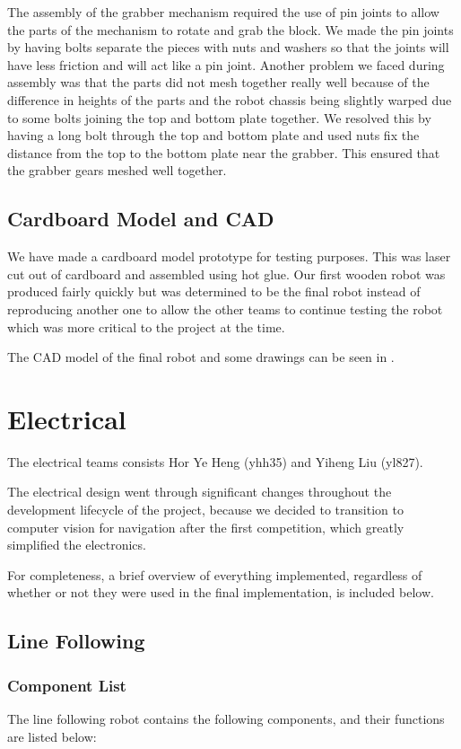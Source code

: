 \documentclass{article}
\begin{document}
\quad The assembly of the grabber mechanism required the use of pin joints to allow the parts of the mechanism to rotate and grab the block. We made the pin joints by having bolts separate the pieces with nuts and washers so that the joints will have less friction and will act like a pin joint. Another problem we faced during assembly was that the parts did not mesh together really well because of the difference in heights of the parts and the robot chassis being slightly warped due to some bolts joining the top and bottom plate together. We resolved this by having a long bolt through the top and bottom plate and used nuts fix the distance from the top to the bottom plate near the grabber. This ensured that the grabber gears meshed well together.

\subsection{Cardboard Model and CAD}
\quad We have made a cardboard model prototype for testing purposes. This was laser cut out of cardboard and assembled using hot glue. Our first wooden robot was produced fairly quickly but was determined to be the final robot instead of reproducing another one to allow the other teams to continue testing the robot which was more critical to the project at the time.

The CAD model of the final robot and some drawings can be seen in .

\section{Electrical}
\quad The electrical teams consists Hor Ye Heng (yhh35) and Yiheng Liu (yl827). 

The electrical design went through significant changes throughout the development lifecycle of the project, because we decided to transition to computer vision for navigation after the first competition, which greatly simplified the electronics.

For completeness, a brief overview of everything implemented, regardless of whether or not they were used in the final implementation, is included below.

\subsection{Line Following}
\subsubsection{Component List}
The line following robot contains the following components, and their functions are listed below:
\end{document}

